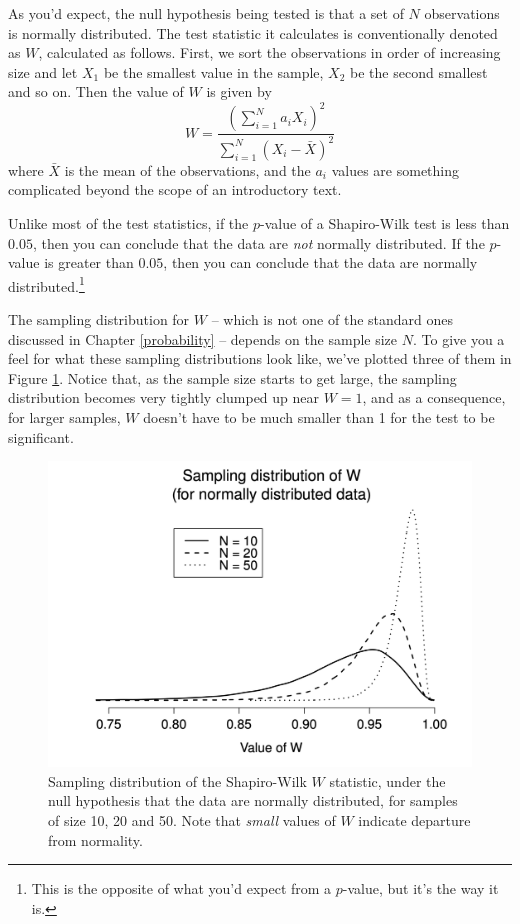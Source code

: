 \documentclass[
  11pt,
  a4paper,
  twoside,symmetric,openright]{book}
\theoremstyle{break}
\theoremstyle{break}
\begin{document}
As you'd expect, the null hypothesis being tested is that a set of \(N\) observations is normally distributed. The test statistic it calculates is conventionally denoted as \(W\), calculated as follows. First, we sort the observations in order of increasing size and let \(X_1\) be the smallest value in the sample, \(X_2\) be the second smallest and so on. Then the value of \(W\) is given by
\[
W = \frac{ \left( \sum_{i = 1}^N a_i X_i \right)^2 }{ \sum_{i = 1}^N (X_i - \bar{X})^2}
\]
where \(\bar{X}\) is the mean of the observations, and the \(a_i\) values are something complicated beyond the scope of an introductory text.

Unlike most of the test statistics, if the \(p\)-value of a Shapiro-Wilk test is less than \(0.05\), then you can conclude that the data are \emph{not} normally distributed. If the \(p\)-value is greater than \(0.05\), then you can conclude that the data are normally distributed.\footnote{This is the opposite of what you'd expect from a \(p\)-value, but it's the way it is.}

The sampling distribution for \(W\) -- which is not one of the standard ones discussed in Chapter \ref{probability} -- depends on the sample size \(N\). To give you a feel for what these sampling distributions look like, we've plotted three of them in Figure \ref{fig:swdist}. Notice that, as the sample size starts to get large, the sampling distribution becomes very tightly clumped up near \(W=1\), and as a consequence, for larger samples, \(W\) doesn't have to be much smaller than 1 for the test to be significant.



\begin{figure}

{\centering \includegraphics[width=0.6\linewidth]{resources/image/shapirowilkdist} 

}

\caption{Sampling distribution of the Shapiro-Wilk \(W\) statistic, under the null hypothesis that the data are normally distributed, for samples of size 10, 20 and 50. Note that \emph{small} values of \(W\) indicate departure from normality.}\label{fig:swdist}
\end{figure}
\end{document}
